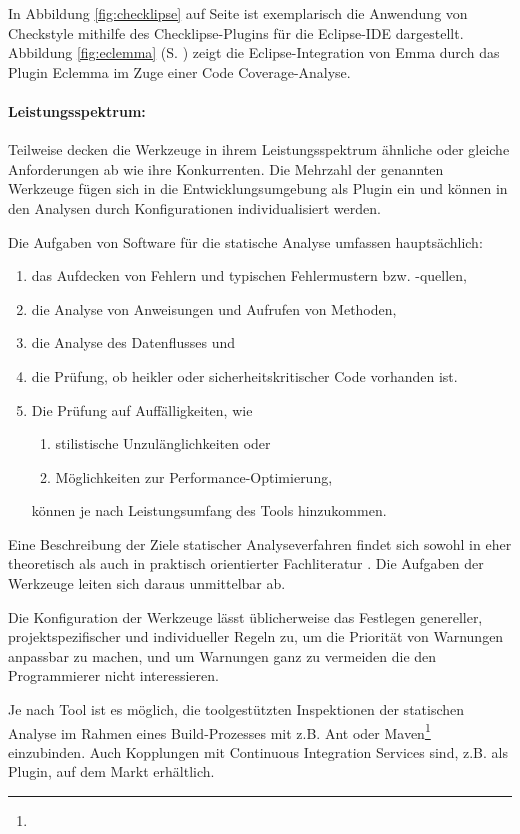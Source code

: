 In Abbildung \ref{fig:checklipse} auf Seite \pageref{fig:checklipse} ist exemplarisch die Anwendung von Checkstyle mithilfe des Checklipse-Plugins für die Eclipse-IDE dargestellt. Abbildung \ref{fig:eclemma} (S. \pageref{fig:eclemma}) zeigt die Eclipse-Integration von Emma durch das Plugin Eclemma im Zuge einer Code Coverage-Analyse.


\paragraph{Leistungsspektrum:} Teilweise decken die Werkzeuge in ihrem Leistungsspektrum ähnliche oder gleiche Anforderungen ab wie ihre Konkurrenten. Die Mehrzahl der genannten Werkzeuge fügen sich in die Entwicklungsumgebung als Plugin ein und können in den Analysen durch Konfigurationen individualisiert werden. 

Die Aufgaben von Software für die statische Analyse umfassen hauptsächlich:
\begin{enumerate}
\item das Aufdecken von Fehlern und typischen Fehlermustern bzw. -quellen,
\item die Analyse von Anweisungen und Aufrufen von Methoden,
\item die Analyse des Datenflusses und
\item die Prüfung, ob heikler oder sicherheitskritischer Code vorhanden ist. 
\item Die Prüfung auf Auffälligkeiten, wie \begin{enumerate}
\item stilistische Unzulänglichkeiten oder
\item Möglichkeiten zur Performance-Optimierung,
\end{enumerate} können je nach Leistungsumfang des Tools hinzukommen.
\end{enumerate}

Eine Beschreibung der Ziele statischer Analyseverfahren findet sich sowohl in eher theoretisch \citep[S. 270]{liggesmeyer2009} als auch in praktisch orientierter Fachliteratur \citep[S. 98]{linz2010}. Die Aufgaben der Werkzeuge leiten sich daraus unmittelbar ab.

Die Konfiguration der Werkzeuge lässt üblicherweise das Festlegen genereller, projektspezifischer und individueller Regeln zu, um die Priorität von Warnungen anpassbar zu machen, und um Warnungen ganz zu vermeiden die den Programmierer nicht interessieren.

Je nach Tool ist es möglich, die toolgestützten Inspektionen der statischen Analyse im Rahmen eines Build-Prozesses mit z.B. Ant oder Maven\footnote{} einzubinden. Auch Kopplungen mit Continuous Integration Services sind, z.B. als Plugin, auf dem Markt erhältlich.

